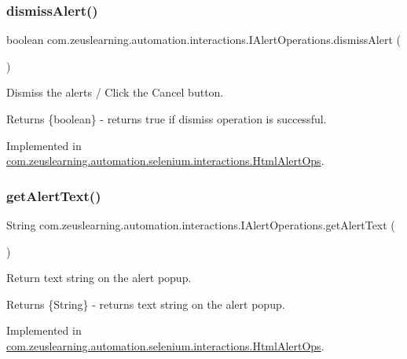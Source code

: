 \subsubsection{\texorpdfstring{dismiss\+Alert()}{dismissAlert()}}
{\footnotesize\ttfamily boolean com.\+zeuslearning.\+automation.\+interactions.\+I\+Alert\+Operations.\+dismiss\+Alert (\begin{DoxyParamCaption}{ }\end{DoxyParamCaption})}

Dismiss the alerts / Click the {\ttfamily Cancel} button.

\begin{DoxyReturn}{Returns}
\{boolean\} -\/ returns {\ttfamily true} if dismiss operation is successful. 
\end{DoxyReturn}


Implemented in \hyperlink{classcom_1_1zeuslearning_1_1automation_1_1selenium_1_1interactions_1_1HtmlAlertOps_aac58187434100d2fe2091f388f082c22}{com.\+zeuslearning.\+automation.\+selenium.\+interactions.\+Html\+Alert\+Ops}.

\hypertarget{interfacecom_1_1zeuslearning_1_1automation_1_1interactions_1_1IAlertOperations_a25201bfa012a2411b487821f1837476a}{}\label{interfacecom_1_1zeuslearning_1_1automation_1_1interactions_1_1IAlertOperations_a25201bfa012a2411b487821f1837476a} 
\subsubsection{\texorpdfstring{get\+Alert\+Text()}{getAlertText()}}
{\footnotesize\ttfamily String com.\+zeuslearning.\+automation.\+interactions.\+I\+Alert\+Operations.\+get\+Alert\+Text (\begin{DoxyParamCaption}{ }\end{DoxyParamCaption})}

Return text string on the alert popup.

\begin{DoxyReturn}{Returns}
\{String\} -\/ returns text string on the alert popup. 
\end{DoxyReturn}


Implemented in \hyperlink{classcom_1_1zeuslearning_1_1automation_1_1selenium_1_1interactions_1_1HtmlAlertOps_a7d65f164e9145ca8035e196c7dd7da87}{com.\+zeuslearning.\+automation.\+selenium.\+interactions.\+Html\+Alert\+Ops}.

